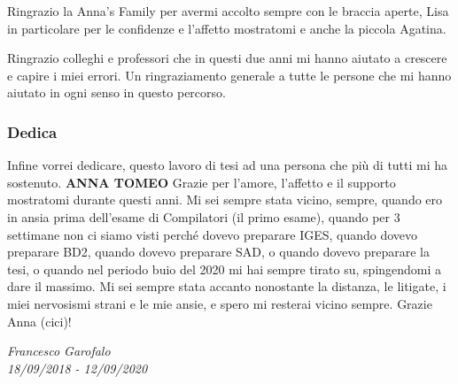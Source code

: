 {Ringrazio la Anna’s Family per avermi accolto sempre con le braccia aperte, Lisa in particolare per le confidenze e l’affetto mostratomi e anche la piccola Agatina. 

Ringrazio colleghi e professori che in questi due anni mi hanno aiutato a crescere e capire i miei errori. 
\newline
Un ringraziamento generale a tutte le persone che mi hanno aiutato in ogni senso in questo percorso.
\newline
\subsubsection{Dedica}
Infine vorrei dedicare, questo lavoro di tesi ad una persona che più di tutti mi ha sostenuto. 
\newline
\newline
\textbf{ANNA TOMEO}
\newline
Grazie per l’amore, l’affetto e il supporto mostratomi durante questi anni. Mi sei sempre stata vicino, sempre, quando ero in ansia prima dell’esame di Compilatori (il primo esame), quando per 3 settimane non ci siamo visti perché dovevo preparare IGES, quando dovevo preparare BD2, quando dovevo preparare SAD, o quando dovevo preparare la tesi, o quando nel periodo buio del 2020 mi hai sempre tirato su, spingendomi a dare il massimo.  
\newline
Mi sei sempre stata accanto nonostante la distanza, le litigate, i miei nervosismi strani e le mie ansie, e spero mi resterai vicino sempre. 
\newline
Grazie Anna (cici)!  }
\newline
\newline

\vspace{15mm}
\noindent
\begin{minipage}[t]{1.0\textwidth}\flushright
	{\large{ \it Francesco Garofalo\\
	18/09/2018 - 12/09/2020 }}
\end{minipage}    
